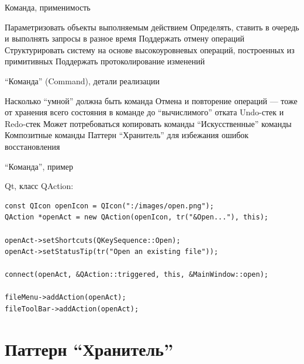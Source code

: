 \documentclass{../../slides-style}
\begin{document}
    \begin{frame}{Команда, применимость}
        \begin{outline}
            \1 Параметризовать объекты выполняемым действием
            \1 Определять, ставить в очередь и выполнять запросы в разное время
            \1 Поддержать отмену операций
            \1 Структурировать систему на основе высокоуровневых операций, построенных из примитивных
            \1 Поддержать протоколирование изменений
        \end{outline}
    \end{frame}

    \begin{frame}{\enquote{Команда} (Command), детали реализации}
        \begin{outline}
            \1 Насколько \enquote{умной} должна быть команда
            \1 Отмена и повторение операций --- тоже от хранения всего состояния в команде до \enquote{вычислимого} отката
                \2 Undo-стек и Redo-стек
                \2 Может потребоваться копировать команды
                \2 \enquote{Искусственные} команды
                \2 Композитные команды
            \1 Паттерн \enquote{Хранитель} для избежания ошибок восстановления
        \end{outline}
    \end{frame}

    \begin{frame}[fragile]{\enquote{Команда}, пример}
        \begin{outline}
            \1 Qt, класс QAction:
            \begin{verbatim}
const QIcon openIcon = QIcon(":/images/open.png");
QAction *openAct = new QAction(openIcon, tr("&Open..."), this);

openAct->setShortcuts(QKeySequence::Open);
openAct->setStatusTip(tr("Open an existing file"));

connect(openAct, &QAction::triggered, this, &MainWindow::open);

fileMenu->addAction(openAct);
fileToolBar->addAction(openAct);
            \end{verbatim}
        \end{outline}
    \end{frame}

    \section{Паттерн \enquote{Хранитель}}
\end{document}
